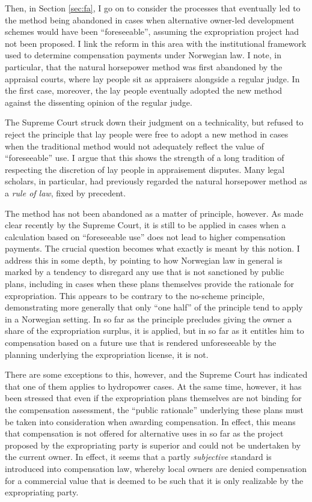 Then, in Section \ref{sec:fa}, I go on to consider the processes that eventually led to the method being abandoned in cases when alternative owner-led development schemes would have been ``foreseeable'', assuming the expropriation project had not been proposed. I link the reform in this area with the institutional framework used to determine compensation payments under Norwegian law. I note, in particular, that the natural horsepower method was first abandoned by the appraisal courts, where lay people sit as appraisers alongside a regular judge. In the first case, moreover, the lay people eventually adopted the new method against the dissenting opinion of the regular judge. 

The Supreme Court struck down their judgment on a technicality, but refused to reject the principle that lay people were free to adopt a new method in cases when the traditional method would not adequately reflect the value of ``foreseeable'' use. I argue that this shows the strength of a long tradition of respecting the discretion of lay people in appraisement disputes. Many legal scholars, in particular, had previously regarded the natural horsepower method as a {\it rule of law}, fixed by precedent.

The method has not been abandoned as a matter of principle, however. As made clear recently by the Supreme Court, it is still to be applied in cases when a calculation based on ``foreseeable use'' does not lead to higher compensation payments. The crucial question becomes what exactly is meant by this notion. I address this in some depth, by pointing to how Norwegian law in general is  marked by a tendency to disregard any use that is not sanctioned by public plans, including in cases when these plans themselves provide the rationale for expropriation. This appears to be contrary to the no-scheme principle, demonstrating more generally that only ``one half'' of the principle tend to apply in a Norwegian setting. In so far as the principle precludes giving the owner a share of the expropriation surplus, it is applied, but in so far as it entitles him to compensation based on a future use that is rendered unforeseeable by the planning underlying the expropriation license, it is not.

There are some exceptions to this, however, and the Supreme Court has indicated that one of them applies to hydropower cases. At the same time, however, it has been stressed that even if the expropriation plans themselves are not binding for the compensation assessment, the ``public rationale'' underlying these plans must be taken into consideration when awarding compensation. In effect, this means that compensation is not offered for alternative uses in so far as the project proposed by the expropriating party is superior and could not be undertaken by the current owner. In effect, it seems that a partly {\it subjective} standard is introduced into compensation law, whereby local owners are denied compensation for a commercial value that is deemed to be such that it is only realizable by the expropriating party.


